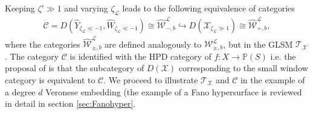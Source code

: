 \documentclass[a4paper,11pt]{article}
\numberwithin{equation}{section}
\begin{document}
Keeping 
$\zeta'\gg 1$ and varying $\zeta_{\mathcal{L}}$ leads to the following 
equivalence of categories
\begin{eqnarray}\label{HPDC}
\mathcal{C}=D(\widehat{Y}_{\zeta_{\mathcal{L}}\ll 
-1},\widehat{W}_{\zeta_{\mathcal{L}}\ll 
-1})\cong\widehat{\mathcal{W}}^{\mathcal{L}}_{-,b}\hookrightarrow 
D(\mathcal{X}_{\zeta_{\mathcal{L}}\gg 
1})\cong\widehat{\mathcal{W}}^{\mathcal{L}}_{+,b},
\end{eqnarray}
where the categories $\widehat{\mathcal{W}}^{\mathcal{L}}_{\pm,b}$ are defined 
analogously 
to $\mathcal{W}^{\mathcal{L}}_{\pm,b}$, but in the GLSM 
$\mathcal{T}_{\mathcal{X}}$. The category $\mathcal{C}$ is 
identified with the HPD category of $f:X\rightarrow\mathbb{P}(S)$ i.e. the 
proposal of \cite{Chen:2020iyo,ballard2017homological,rennemo2017fundamental} 
is that the subcategory of $D(\mathcal{X})$ corresponding to the small 
window category is equivalent to $\mathcal{C}$. We proceed 
to illustrate $\mathcal{T}_{\mathcal{X}}$ and $\mathcal{C}$ in the example of a 
degree $d$ Veronese embedding (the example of a Fano hypersurface is reviewed 
in detail in section \ref{sec:Fanohyper}.
\end{document}

